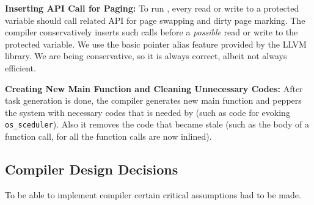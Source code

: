 \textbf{Inserting API Call for Paging:} To run \sys, every read or write to a protected variable should call related API for page swapping and dirty page marking. The compiler conservatively inserts such calls before a {\em possible} read or write to the protected variable. We use the basic pointer alias feature provided by the LLVM library. We are being conservative, so it is always correct, albeit not always efficient.

\textbf{Creating New Main Function and Cleaning Unnecessary Codes:} After task generation is done, the compiler generates new main function and peppers the system with necessary codes that is needed by \sys (such as code for evoking {\tt os\_sceduler}). Also it removes the code that became stale (such as the body of a function call, for all the function calls are now inlined).

\subsection{Compiler Design Decisions}
\label{sec:compiler_limitations}

To be able to implement \sys compiler certain critical assumptions had to be made. 

